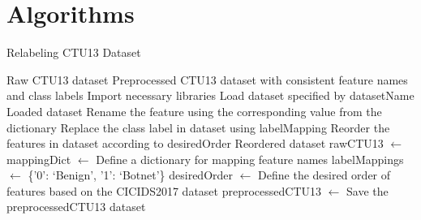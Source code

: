\chapter{Algorithms}\label{chap:algorithms}

\begin{algorithm}[ht]
    \caption{Relabeling CTU13 Dataset}\label{alg:relabelCTU13}
    \begin{algorithmic}[1]
    \Require%
    Raw CTU13 dataset
    \Ensure%
    Preprocessed CTU13 dataset with consistent feature names and class labels
    \State%
    Import necessary libraries
        \State%
        Load dataset specified by datasetName
        \State%
        \Return%
        Loaded dataset
    \EndFunction%
                \State%
                Rename the feature using the corresponding value from the dictionary
            \EndIf%
        \EndFor%
    \EndFunction%
            \State%
            Replace the class label in dataset using labelMapping
        \EndFor%
    \EndFunction%
        \State%
        Reorder the features in dataset according to desiredOrder
        \State%
        \Return%
        Reordered dataset
    \EndFunction%
    \State%
    rawCTU13 $\gets$ 
    \State%
    mappingDict $\gets$ Define a dictionary for mapping feature names
    \State%
    \State%
    labelMappings $\gets$ \{'0': `Benign', '1': `Botnet'\}
    \State%
    \State%
    desiredOrder $\gets$ Define the desired order of features based on the CICIDS2017 dataset
    \State%
    preprocessedCTU13 $\gets$ 
    \State%
    Save the preprocessedCTU13 dataset
    \end{algorithmic}
\end{algorithm}


